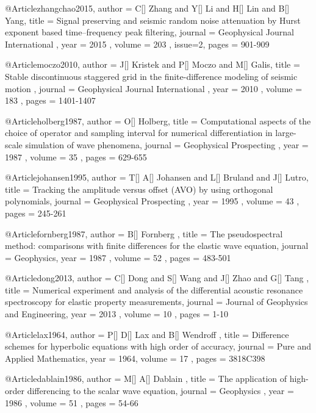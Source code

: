 @Article{zhangchao2015,
 author =  {  C[] Zhang and Y[] Li and H[] Lin and B[] Yang},
 title =   {Signal preserving and seismic random noise attenuation by Hurst exponent based time–frequency peak filtering},
 journal = { Geophysical Journal International },
 year =    { 2015 },
 volume =  { 203 },
 issue=2,
 pages =   { 901-909 }
}



@Article{moczo2010,
 author =  {  J[] Kristek and P[] Moczo and M[] Galis},
 title =   {Stable discontinuous staggered grid in the finite-difference modeling of seismic motion },
 journal = { Geophysical Journal International },
 year =    { 2010 },
 volume =  { 183 },
 pages =   { 1401-1407 }
}

@Article{holberg1987,
 author =  { O[] Holberg},
 title =   {Computational aspects of the choice of operator and sampling interval for numerical differentiation in large-scale simulation of wave phenomena},
 journal = { Geophysical Prospecting },
 year =    { 1987 },
 volume =  { 35 },
 pages =   { 629-655 }
}

@Article{johansen1995,
 author =  { T[] A[] Johansen and L[] Bruland and J[] Lutro},
 title =   {Tracking the amplitude versus offset (AVO) by using orthogonal polynomials},
 journal = { Geophysical Prospecting },
 year =    { 1995 },
 volume =  { 43 },
 pages =   { 245-261 }
}

@Article{fornberg1987,
 author =  { B[] Fornberg },
 title =   {The pseudospectral method: comparisons with finite differences for the elastic
wave equation},
 journal = { Geophysics},
 year =    { 1987 },
 volume =  { 52 },
 pages =   { 483-501 }
}

@Article{dong2013,
 author =  { C[] Dong and S[] Wang and J[] Zhao and G[] Tang },
 title =   {Numerical experiment and analysis of the differential acoustic resonance spectroscopy for elastic property measurements},
 journal = { Journal of Geophysics and Engineering},
 year =    { 2013 },
 volume =  { 10 },
 pages =   { 1-10 }
}

@Article{lax1964,
 author =  { P[] D[] Lax and B[] Wendroff },
 title =   {Difference schemes for hyperbolic equations with high order of accuracy},
 journal = { Pure and Applied Mathematics},
 year =    { 1964},
 volume =  { 17 },
 pages =   { 381\A8C398 }
}

@Article{dablain1986,
 author =  { M[] A[] Dablain },
 title =   {The application of high-order differencing to the scalar wave equation},
 journal = { Geophysics },
 year =    { 1986 },
 volume =  { 51 },
 pages =   { 54-66 }
}


